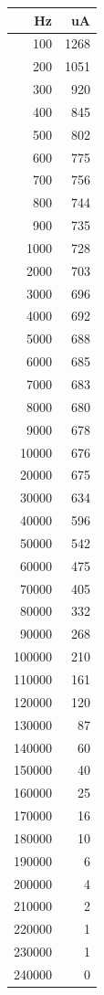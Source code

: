 \begin{table}[H]
\begin{minipage}[b]{0.30\linewidth}
\centering
\begin{tabular}{ r |  r }
    \hline
    Hz & uA \\ \hline
    100 & 1268 \\ \hline
    200 & 1051 \\ \hline
    300 & 920 \\ \hline
    400 & 845 \\ \hline
    500 & 802 \\ \hline
    600 & 775 \\ \hline
    700 & 756 \\ \hline
    800 & 744 \\ \hline
    900 & 735 \\ \hline
    1000 & 728 \\ \hline
    2000 & 703 \\ \hline
    3000 & 696 \\ \hline
    4000 & 692 \\ \hline
    5000 & 688 \\ \hline
    6000 & 685 \\ \hline
    7000 & 683 \\ \hline
    8000 & 680 \\ \hline
    9000 & 678 \\ \hline
    10000 & 676 \\ \hline
    20000 & 675 \\ \hline
    30000 & 634 \\ \hline
    40000 & 596 \\ \hline
    50000 & 542 \\ \hline
    60000 & 475 \\ \hline
    70000 & 405 \\ \hline
    80000 & 332 \\ \hline
    90000 & 268 \\ \hline
    100000 & 210 \\ \hline
    110000 & 161 \\ \hline
    120000 & 120 \\ \hline
    130000 & 87 \\ \hline
    140000 & 60 \\ \hline
    150000 & 40 \\ \hline
    160000 & 25 \\ \hline
    170000 & 16 \\ \hline
    180000 & 10 \\ \hline
    190000 & 6 \\ \hline
    200000 & 4 \\ \hline
    210000 & 2 \\ \hline
    220000 & 1 \\ \hline
    230000 & 1 \\ \hline
    240000 & 0 \\ \hline
        

\end{tabular}
\end{minipage}
\end{table}
